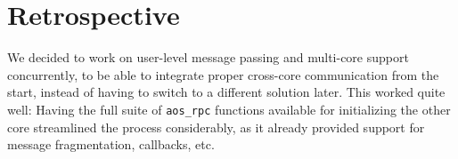 \section{Retrospective}
We decided to work on user-level message passing and multi-core support concurrently, to be able to integrate proper cross-core communication from the start, instead of having to switch to a different solution later. This worked quite well: Having the full suite of \texttt{aos\_rpc} functions available for initializing the other core streamlined the process considerably, as it already provided support for message fragmentation, callbacks, etc.
